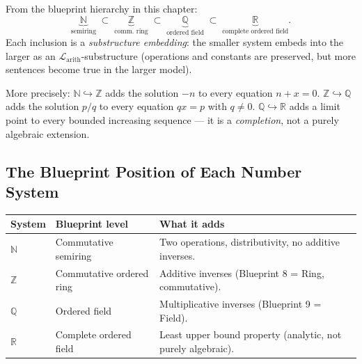 \begin{remark}
From the blueprint hierarchy in this chapter:
\[
\underbrace{\mathbb{N}}_{\text{semiring}}
\;\subset\;
\underbrace{\mathbb{Z}}_{\text{comm.\ ring}}
\;\subset\;
\underbrace{\mathbb{Q}}_{\text{ordered field}}
\;\subset\;
\underbrace{\mathbb{R}}_{\text{complete ordered field}}.
\]
Each inclusion is a \emph{substructure embedding}: the smaller system
embeds into the larger as an $\mathcal{L}_{\mathrm{arith}}$-substructure
(operations and constants are preserved, but more sentences become true
in the larger model).

More precisely:
$\mathbb{N} \hookrightarrow \mathbb{Z}$ adds the solution $-n$ to every
equation $n + x = 0$.
$\mathbb{Z} \hookrightarrow \mathbb{Q}$ adds the solution $p/q$ to every
equation $qx = p$ with $q \neq 0$.
$\mathbb{Q} \hookrightarrow \mathbb{R}$ adds a limit point to every
bounded increasing sequence — it is a \emph{completion}, not a purely
algebraic extension.
\end{remark}

\subsection{The Blueprint Position of Each Number System}

\begin{tcolorbox}[colback=gray!6, colframe=gray!40, arc=2pt,
  left=6pt, right=6pt, top=4pt, bottom=4pt,
  title={\small\textbf{Number Systems in the Blueprint Hierarchy}},
  fonttitle=\small\bfseries]
\small
\renewcommand{\arraystretch}{1.3}
\begin{tabular}{@{} l l l @{}}
\toprule
\textbf{System} & \textbf{Blueprint level} & \textbf{What it adds} \\
\midrule
$\mathbb{N}$
  & Commutative semiring
  & Two operations, distributivity, no additive inverses. \\
$\mathbb{Z}$
  & Commutative ordered ring
  & Additive inverses (Blueprint 8 = Ring, commutative). \\
$\mathbb{Q}$
  & Ordered field
  & Multiplicative inverses (Blueprint 9 = Field). \\
$\mathbb{R}$
  & Complete ordered field
  & Least upper bound property (analytic, not purely algebraic). \\
\bottomrule
\end{tabular}
\end{tcolorbox}

